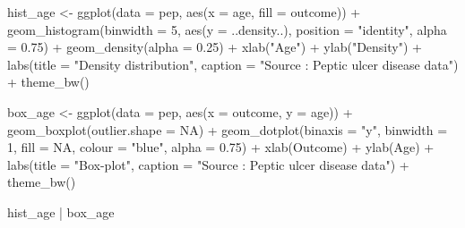 \documentclass[
  10pt,
]{krantz}
\newenvironment{Shaded}{\begin{snugshade}}{\end{snugshade}}
\newcommand{\AttributeTok}[1]{\textcolor[rgb]{0.77,0.63,0.00}{#1}}
\newcommand{\ConstantTok}[1]{\textcolor[rgb]{0.00,0.00,0.00}{#1}}
\newcommand{\DecValTok}[1]{\textcolor[rgb]{0.00,0.00,0.81}{#1}}
\newcommand{\FloatTok}[1]{\textcolor[rgb]{0.00,0.00,0.81}{#1}}
\newcommand{\FunctionTok}[1]{\textcolor[rgb]{0.00,0.00,0.00}{#1}}
\newcommand{\NormalTok}[1]{#1}
\newcommand{\OtherTok}[1]{\textcolor[rgb]{0.56,0.35,0.01}{#1}}
\newcommand{\SpecialCharTok}[1]{\textcolor[rgb]{0.00,0.00,0.00}{#1}}
\newcommand{\StringTok}[1]{\textcolor[rgb]{0.31,0.60,0.02}{#1}}
\begin{document}
\begin{Shaded}
\begin{Highlighting}[]
\NormalTok{hist\_age }\OtherTok{\textless{}{-}} \FunctionTok{ggplot}\NormalTok{(}\AttributeTok{data =}\NormalTok{ pep, }\FunctionTok{aes}\NormalTok{(}\AttributeTok{x =}\NormalTok{ age, }\AttributeTok{fill =}\NormalTok{ outcome)) }\SpecialCharTok{+}
    \FunctionTok{geom\_histogram}\NormalTok{(}\AttributeTok{binwidth =} \DecValTok{5}\NormalTok{, }\FunctionTok{aes}\NormalTok{(}\AttributeTok{y =}\NormalTok{ ..density..),  }
                   \AttributeTok{position =} \StringTok{"identity"}\NormalTok{, }\AttributeTok{alpha =} \FloatTok{0.75}\NormalTok{) }\SpecialCharTok{+} 
  \FunctionTok{geom\_density}\NormalTok{(}\AttributeTok{alpha =} \FloatTok{0.25}\NormalTok{) }\SpecialCharTok{+}
  \FunctionTok{xlab}\NormalTok{(}\StringTok{"Age"}\NormalTok{) }\SpecialCharTok{+}
  \FunctionTok{ylab}\NormalTok{(}\StringTok{"Density"}\NormalTok{) }\SpecialCharTok{+}
  \FunctionTok{labs}\NormalTok{(}\AttributeTok{title =} \StringTok{"Density distribution"}\NormalTok{,}
       \AttributeTok{caption =} \StringTok{"Source : Peptic ulcer disease data"}\NormalTok{) }\SpecialCharTok{+}
  \FunctionTok{theme\_bw}\NormalTok{()}

\NormalTok{box\_age }\OtherTok{\textless{}{-}} \FunctionTok{ggplot}\NormalTok{(}\AttributeTok{data =}\NormalTok{ pep, }\FunctionTok{aes}\NormalTok{(}\AttributeTok{x =}\NormalTok{ outcome, }\AttributeTok{y =}\NormalTok{ age)) }\SpecialCharTok{+}
  \FunctionTok{geom\_boxplot}\NormalTok{(}\AttributeTok{outlier.shape =} \ConstantTok{NA}\NormalTok{) }\SpecialCharTok{+} 
  \FunctionTok{geom\_dotplot}\NormalTok{(}\AttributeTok{binaxis =} \StringTok{"y"}\NormalTok{, }\AttributeTok{binwidth =} \DecValTok{1}\NormalTok{, }\AttributeTok{fill =} \ConstantTok{NA}\NormalTok{, }\AttributeTok{colour =} \StringTok{"blue"}\NormalTok{, }\AttributeTok{alpha =} \FloatTok{0.75}\NormalTok{) }\SpecialCharTok{+}
  \FunctionTok{xlab}\NormalTok{(}\StringTok{\textquotesingle{}Outcome\textquotesingle{}}\NormalTok{) }\SpecialCharTok{+} \FunctionTok{ylab}\NormalTok{(}\StringTok{\textquotesingle{}Age\textquotesingle{}}\NormalTok{) }\SpecialCharTok{+}
  \FunctionTok{labs}\NormalTok{(}\AttributeTok{title =} \StringTok{"Box{-}plot"}\NormalTok{,}
       \AttributeTok{caption =} \StringTok{"Source : Peptic ulcer disease data"}\NormalTok{) }\SpecialCharTok{+}
  \FunctionTok{theme\_bw}\NormalTok{()}


\NormalTok{hist\_age }\SpecialCharTok{|}\NormalTok{  box\_age}
\end{Highlighting}
\end{Shaded}
\end{document}
